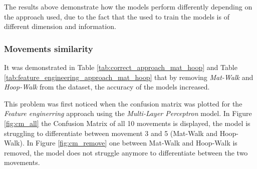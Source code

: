             The results above demonstrate how the models perform differently depending on the approach used, due to the fact that the used to train the models is of different dimension and information. 

        \subsubsection{Movements similarity}   
        
            It was demonstrated in Table \ref{tab:correct_approach_mat_hoop} and Table \ref{tab:feature_engineering_approach_mat_hoop} that by removing \textit{Mat-Walk} and \textit{Hoop-Walk} from the dataset, the accuracy of the models increased.

            This problem was first noticed when the confusion matrix was plotted for the \textit{Feature enginerring} approach using the \textit{Multi-Layer Perceptron} model. In
            Figure \ref{fig:cm_all} the Confusion Matrix of all 10 movements is displayed, the model is struggling to differentiate between movement 3 and 5 (Mat-Walk and Hoop-Walk). In Figure \ref{fig:cm_remove} one between Mat-Walk and Hoop-Walk is removed, the model does not struggle anymore to differentiate between the two movements.
            
